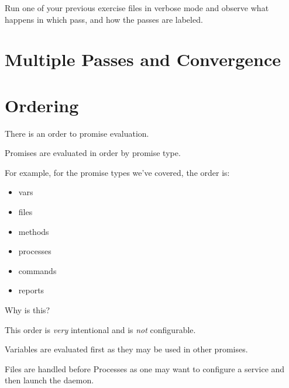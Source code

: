 \begin{aside}
\label{aside:exercise_20}

Run one of your previous exercise files in verbose mode and observe what
happens in which pass, and how the passes are labeled.

\end{aside}





\section{Multiple Passes and Convergence}





\section{Ordering}





There is an order to promise evaluation.

Promises are evaluated in order by promise type.

For example, for the promise types we've covered,
the order is:

\begin{itemize}
\item{} vars
\item{} files
\item{} methods
\item{} processes
\item{} commands
\item{} reports
\end{itemize}

Why is this?





This order is \emph{very} intentional and is \emph{not} configurable.





Variables are evaluated first as they may be used in other promises.





Files are handled before Processes as one may want to configure a service
and then launch the daemon.





